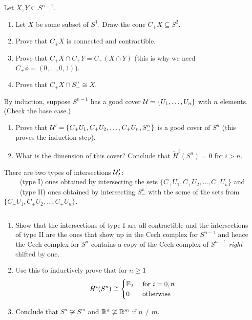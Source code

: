 \begin{ques} Let $X,Y \subseteq S^{n-1}$.
\begin{enumerate}
  \item Let $X$ be some subset of $S^1$. Draw the cone $C_+X \subseteq S^2$.
  \item Prove that $C_+ X$ is connected and contractible.
  \item Prove that $C_+X \cap C_+ Y = C_+(X \cap Y)$ (this is why we need $C_+ \phi = (0,\dots,0,1)$).
  \item Prove that $C_+X \cap S^{n}_- \cong X$.
\end{enumerate}
\end{ques}
\begin{ques} By induction, suppose $S^{n-1}$ has a good cover $\mathcal{U} = \{ U_1, \dots, U_n\}$ with $n$ elements. (Check the base case.)
\begin{enumerate}
  \item  Prove that $\mathcal{U}' = \{ C_+ U_1, C_+ U_2, \dots, C_+ U_n, S^n_-\}$ is a good cover of $S^n$ (this proves the induction step).
  \item What is the dimension of this cover? Conclude that $\check H^{i}(S^n) = 0$ for $i > n$.
\end{enumerate}
\end{ques}
\noindent There are two types of intersections $\mathcal{U}'_I$:\\
$\qquad$ (type I) ones obtained by intersecting the sets $\{ C_+ U_1, C_+ U_2, \dots, C_+ U_n\}$  and \\$\qquad$ (type II) ones obtained by intersecting $S^n_-$ with the some of the sets from $\{ C_+ U_1, C_+ U_2, \dots, C_+ U_n\}$.
\begin{ques} $ $
  \begin{enumerate}
  \item Show that the intersections of type I are all contractible and the intersections of type II are the ones that show up in the Cech complex for $S^{n-1}$ and hence the Cech complex for $S^n$ contains a copy of the Cech complex of $S^{n-1}$ \emph{right} shifted by one.
  \item Use this to inductively prove that for $n \ge 1$
  \begin{align*}
    \check H^i(S^{n}) \cong \begin{cases}
      \mathbb{F}_2 & \mbox{ for } i=0,n \\
      0 & \mbox{ otherwise }
  \end{cases}
  \end{align*}
  \item Conclude that $S^n \not \cong S^m$ and $\mathbb{R}^n \not \cong \mathbb{R}^m$ if $n \neq m$.
\end{enumerate}
\end{ques}
